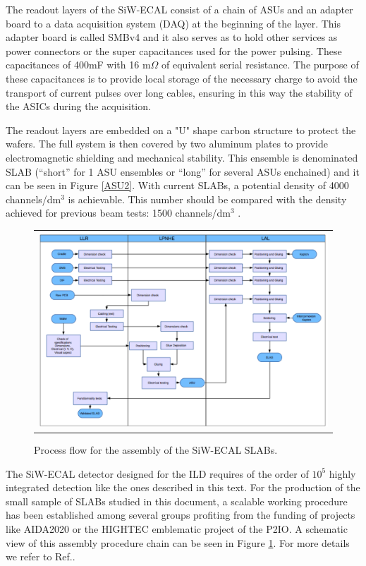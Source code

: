 \documentclass[a4paper,11pt]{article}
\begin{document}
The readout layers of the SiW-ECAL consist of a chain of ASUs and an adapter board
to a data acquisition system (DAQ) at the beginning of the layer.
This adapter board is called SMBv4
and it also serves as to hold other services as power connectors or the super capacitances used for the power pulsing. 
These capacitances of 400mF with 16 m$\Omega$ of equivalent serial resistance. 
The purpose of these capacitances is to provide local storage 
of the necessary charge to avoid the transport of current pulses over long cables, 
ensuring in this way the stability of the ASICs during the acquisition.

The readout layers are embedded on a "U" shape carbon structure to protect the wafers.
The full system is then covered by two aluminum plates
to provide electromagnetic shielding and mechanical stability.
This ensemble is denominated SLAB
(``short'' for 1 ASU ensembles or ``long'' for several ASUs enchained) and it can be seen in
Figure \ref{ASU2}.
With current SLABs, a potential density of
4000 channels/dm$^{3}$ is achievable. This number should be compared with
the density achieved for previous beam tests: 1500 channels/dm$^{3}$ \cite{Amjad:2014tha}.

\begin{figure}[!t]
\centering
\begin{tabular}{l}
\includegraphics[width=6.0in]{figs/assembly.png} 
\end{tabular}
\caption{Process flow for the assembly of the SiW-ECAL SLABs.}
\label{assembly}
\end{figure}

The SiW-ECAL detector designed for the ILD requires of the order
of $10^{5}$ highly integrated detection like the ones described in this text.
For the production of the small sample of SLABs studied in this document,
a scalable working procedure has been established among several groups \cite{Boudry:2318814}
profiting from the funding of projects like AIDA2020 or the HIGHTEC emblematic project
of the P2IO. A schematic view of this assembly procedure chain can be seen in
Figure \ref{assembly}. For more details we refer to Ref.\cite{Boudry:2318814}.
\end{document}
